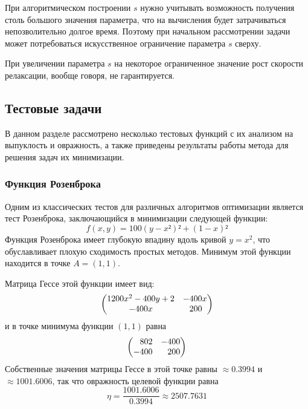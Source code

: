 При алгоритмическом построении $s$ нужно учитывать возможность
получения столь большого значения параметра, что на вычисления будет
затрачиваться непозволительно долгое время. Поэтому при начальном
рассмотрении задачи может потребоваться искусственное ограничение
параметра $s$ сверху.

\begin{rem}
  \label{rem:cheb-rel-speed}
  При увеличении параметра $s$ на некоторое ограниченное значение рост
  скорости релаксации, вообще говоря, не гарантируется.
\end{rem}

\clearpage
\subsection{Тестовые задачи}

В данном разделе рассмотрено несколько тестовых функций с их анализом
на выпуклость и овражность, а также приведены результаты работы метода
\relch для решения задач их минимизации.

\subsubsection{Функция Розенброка}

Одним из классических тестов для различных алгоритмов оптимизации
является тест Розенброка, заключающийся в минимизации следующей
функции:
\begin{equation}
  \label{eq:rosenbrock}
  f(x, y) = 100(y - x²)² + (1 - x)²
\end{equation}
Функция Розенброка имеет глубокую впадину вдоль кривой $y=x^2$, что
обуславливает плохую сходимость простых методов. Минимум этой функции
находится в точке $A=(1,1)$.

Матрица Гессе этой функции имеет вид:
\begin{equation*}
  \begin{pmatrix}
    1200x^2-400y+2 & -400x \\
    -400x & \phm200\phantom{x}
  \end{pmatrix}
\end{equation*}
и в точке минимума функции $(1, 1)$ равна
\begin{equation*}
  \begin{pmatrix}
    \phm 802 & -400 \\ -400 & \phm 200
  \end{pmatrix}
\end{equation*}
Собственные значения матрицы Гессе в этой точке равны ${\approx}0.3994$ и
${\approx}1001.6006$, так что овражность целевой функции равна
\begin{equation*}
  \eta = \frac{1001.6006}{0.3994} \approx 2507.7631
\end{equation*}

